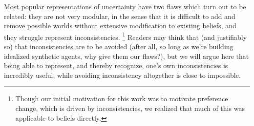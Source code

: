 \documentclass{article}
\begin{document}
	Most popular representations of uncertainty have two flaws which turn out to be related: they are not very modular, in the sense that it is difficult to add and remove possible worlds without extensive modification to existing beliefs, and they struggle represent inconsistencies.%
	\footnote{Though our initial motivation for this work was to motivate preference change, which is driven by inconsistencies, we realized that much of this was applicable to beliefs directly. }
	Readers may think that (and justifiably so) that inconsistencies are to be avoided (after all, so long as we're building idealized synthetic agents, why give them our flaws?), but we will argue here that being able to represent, and thereby recognize, one's own inconsistencies is incredibly useful, while avoiding inconsistency altogether is close to impossible.
\end{document}
